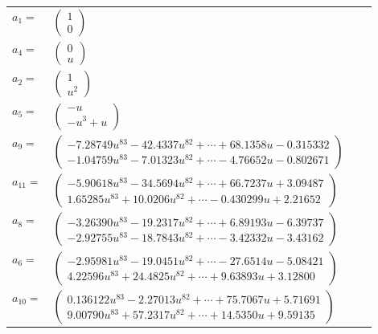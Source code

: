 \documentclass[1p]{elsarticle_modified}
\theoremstyle{definition}
\begin{document}
\begin{tabular}{m{7pt} m{180pt} m{7pt} m{180pt} }
\flushright $a_{1}=$&$\begin{pmatrix}1\\0\end{pmatrix}$ \\
\flushright $a_{4}=$&$\begin{pmatrix}0\\u\end{pmatrix}$ \\
\flushright $a_{2}=$&$\begin{pmatrix}1\\u^2\end{pmatrix}$ \\
\flushright $a_{5}=$&$\begin{pmatrix}- u\\- u^3+u\end{pmatrix}$ \\
\flushright $a_{9}=$&$\begin{pmatrix}-7.28749 u^{83}-42.4337 u^{82}+\cdots+68.1358 u-0.315332\\-1.04759 u^{83}-7.01323 u^{82}+\cdots-4.76652 u-0.802671\end{pmatrix}$ \\
\flushright $a_{11}=$&$\begin{pmatrix}-5.90618 u^{83}-34.5694 u^{82}+\cdots+66.7237 u+3.09487\\1.65285 u^{83}+10.0206 u^{82}+\cdots-0.430299 u+2.21652\end{pmatrix}$ \\
\flushright $a_{8}=$&$\begin{pmatrix}-3.26390 u^{83}-19.2317 u^{82}+\cdots+6.89193 u-6.39737\\-2.92755 u^{83}-18.7843 u^{82}+\cdots-3.42332 u-3.43162\end{pmatrix}$ \\
\flushright $a_{6}=$&$\begin{pmatrix}-2.95981 u^{83}-19.0451 u^{82}+\cdots-27.6514 u-5.08421\\4.22596 u^{83}+24.4825 u^{82}+\cdots+9.63893 u+3.12800\end{pmatrix}$ \\
\flushright $a_{10}=$&$\begin{pmatrix}0.136122 u^{83}-2.27013 u^{82}+\cdots+75.7067 u+5.71691\\9.00790 u^{83}+57.2317 u^{82}+\cdots+14.5350 u+9.59135\end{pmatrix}$ \\

\end{tabular}
\end{document}
